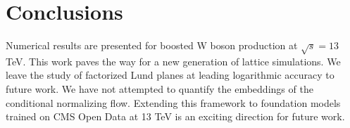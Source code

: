 \section{Conclusions}\label{sec:conclusions}

Numerical results are presented for boosted W boson production at
$\sqrt{s} = 13$ TeV. This work paves the way for a new generation of
lattice simulations. We leave the study of factorized Lund planes at
leading logarithmic accuracy to future work. We have not attempted to
quantify the embeddings of the conditional normalizing flow. Extending
this framework to foundation models trained on CMS Open Data at 13 TeV
is an exciting direction for future work.

